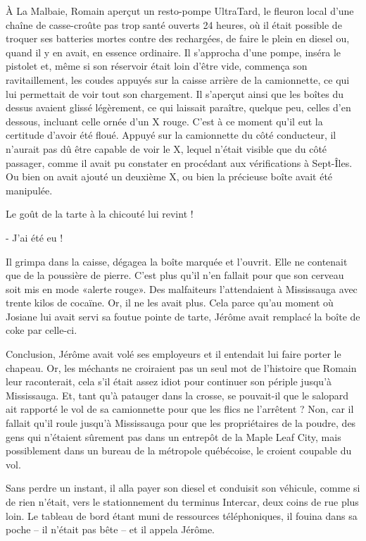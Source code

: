 À La Malbaie, Romain aperçut un resto-pompe UltraTard, le fleuron local d’une chaîne de casse-croûte pas trop santé ouverts 24 heures, où il était possible de troquer ses batteries mortes contre des rechargées, de faire le plein en diesel ou, quand il y en avait, en essence ordinaire. Il s’approcha d’une pompe, inséra le pistolet et, même si son réservoir était loin d’être vide, commença son ravitaillement, les coudes appuyés sur la caisse arrière de la camionnette, ce qui lui permettait de voir tout son chargement. Il s’aperçut ainsi que les boîtes du dessus avaient glissé légèrement, ce qui laissait paraître, quelque peu, celles d’en dessous, incluant celle ornée d’un X rouge. C’est à ce moment qu’il eut la certitude d’avoir été floué. Appuyé sur la camionnette du côté conducteur, il n’aurait pas dû être capable de voir le X, lequel n’était visible que du côté passager, comme il avait pu constater en procédant aux vérifications à Sept-Îles. Ou bien on avait ajouté un deuxième X, ou bien la précieuse boîte avait été manipulée.

Le goût de la tarte à la chicouté lui revint !

- J’ai été eu !

Il grimpa dans la caisse, dégagea la boîte marquée et l’ouvrit. Elle ne contenait que de la poussière de pierre. C’est plus qu’il n’en fallait pour que son cerveau soit mis en mode «alerte rouge». Des malfaiteurs l’attendaient à Mississauga avec trente kilos de cocaïne. Or, il ne les avait plus. Cela parce qu’au moment où Josiane lui avait servi sa foutue pointe de tarte, Jérôme avait remplacé la boîte de coke par celle-ci.

Conclusion, Jérôme avait volé ses employeurs et il entendait lui faire porter le chapeau. Or, les méchants ne croiraient pas un seul mot de l’histoire que Romain leur raconterait, cela s’il était assez idiot pour continuer son périple jusqu’à Mississauga. Et, tant qu’à patauger dans la crosse, se pouvait-il que le salopard ait rapporté le vol de sa camionnette pour que les flics ne l’arrêtent ? Non, car il fallait qu’il roule jusqu’à Mississauga pour que les propriétaires de la poudre, des gens qui n’étaient sûrement pas dans un entrepôt de la Maple Leaf City, mais possiblement dans un bureau de la métropole québécoise, le croient coupable du vol.

Sans perdre un instant, il alla payer son diesel et conduisit son véhicule, comme si de rien n’était, vers le stationnement du terminus Intercar, deux coins de rue plus loin. Le tableau de bord étant muni de ressources téléphoniques, il fouina dans sa poche – il n’était pas bête – et il appela Jérôme.

